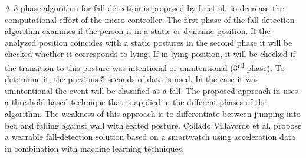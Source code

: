 \documentclass[review]{elsarticle}
\begin{document}
A 3-phase algorithm for fall-detection is proposed by Li et al. \cite{Li2009} to decrease the computational effort of the micro controller. The first phase of the fall-detection algorithm examines if the person is in a static or dynamic position. If the analyzed position coincides with a static postures in the second phase it will be checked whether it corresponds to lying. If in lying position, it will be checked if the transition to this posture was intentional or unintentional (3\textsuperscript{rd} phase). To determine it, the previous 5 seconds of data is used. In the case it was unintentional the event will be classified as a fall. The proposed approach in \cite{Li2009} uses a threshold based technique that is applied in the different phases of the algorithm. The weakness of this approach is to differentiate between jumping into bed and falling against wall with seated posture. Collado Villaverde et al. \cite{colladomachine} propose a wearable fall-detection solution based on a smartwatch using acceleration data in combination with machine learning techniques.
\end{document}
